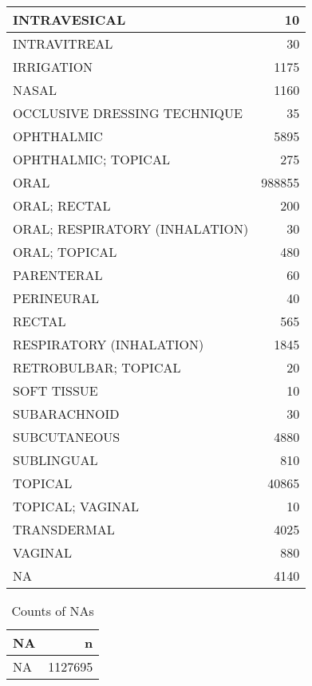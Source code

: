 \documentclass[
]{article}
\newenvironment{Shaded}{\begin{snugshade}}{\end{snugshade}}
\newcommand{\DataTypeTok}[1]{\textcolor[rgb]{0.13,0.29,0.53}{#1}}
\newcommand{\KeywordTok}[1]{\textcolor[rgb]{0.13,0.29,0.53}{\textbf{#1}}}
\newcommand{\NormalTok}[1]{#1}
\newcommand{\OperatorTok}[1]{\textcolor[rgb]{0.81,0.36,0.00}{\textbf{#1}}}
\newcommand{\OtherTok}[1]{\textcolor[rgb]{0.56,0.35,0.01}{#1}}
\newcommand{\StringTok}[1]{\textcolor[rgb]{0.31,0.60,0.02}{#1}}
\begin{document}
\begin{table}
\begin{tabular}[t]{l|r}
\hline
INTRAVESICAL & 10\\
\hline
INTRAVITREAL & 30\\
\hline
IRRIGATION & 1175\\
\hline
NASAL & 1160\\
\hline
OCCLUSIVE DRESSING TECHNIQUE & 35\\
\hline
OPHTHALMIC & 5895\\
\hline
OPHTHALMIC; TOPICAL & 275\\
\hline
ORAL & 988855\\
\hline
ORAL; RECTAL & 200\\
\hline
ORAL; RESPIRATORY (INHALATION) & 30\\
\hline
ORAL; TOPICAL & 480\\
\hline
PARENTERAL & 60\\
\hline
PERINEURAL & 40\\
\hline
RECTAL & 565\\
\hline
RESPIRATORY (INHALATION) & 1845\\
\hline
RETROBULBAR; TOPICAL & 20\\
\hline
SOFT TISSUE & 10\\
\hline
SUBARACHNOID & 30\\
\hline
SUBCUTANEOUS & 4880\\
\hline
SUBLINGUAL & 810\\
\hline
TOPICAL & 40865\\
\hline
TOPICAL; VAGINAL & 10\\
\hline
TRANSDERMAL & 4025\\
\hline
VAGINAL & 880\\
\hline
NA & 4140\\
\hline
\end{tabular}
\end{table}

\begin{Shaded}
\end{Shaded}

\begin{table}

\caption{\label{tab:unnamed-chunk-5}Counts of NAs}
\centering
\begin{tabular}[t]{l|r}
\hline
NA & n\\
\hline
NA & 1127695\\
\hline
\end{tabular}
\end{table}
\end{document}
